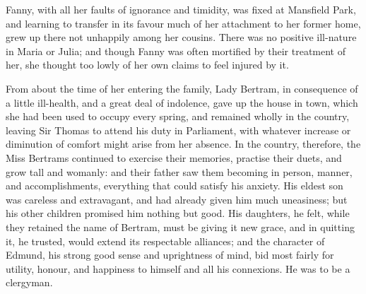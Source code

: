 \documentclass{article}
\begin{document}
Fanny, with all her faults of ignorance and timidity,
was fixed at Mansfield Park, and learning to transfer
in its favour much of her attachment to her former home,
grew up there not unhappily among her cousins.  There was
no positive ill-nature in Maria or Julia; and though
Fanny was often mortified by their treatment of her,
she thought too lowly of her own claims to feel injured
by it.

From about the time of her entering the family,
Lady Bertram, in consequence of a little ill-health,
and a great deal of indolence, gave up the house in town,
which she had been used to occupy every spring,
and remained wholly in the country, leaving Sir Thomas
to attend his duty in Parliament, with whatever increase
or diminution of comfort might arise from her absence.
In the country, therefore, the Miss Bertrams continued
to exercise their memories, practise their duets, and grow
tall and womanly:  and their father saw them becoming
in person, manner, and accomplishments, everything that
could satisfy his anxiety.  His eldest son was careless
and extravagant, and had already given him much uneasiness;
but his other children promised him nothing but good.
His daughters, he felt, while they retained the name
of Bertram, must be giving it new grace, and in quitting it,
he trusted, would extend its respectable alliances;
and the character of Edmund, his strong good sense
and uprightness of mind, bid most fairly for utility,
honour, and happiness to himself and all his connexions.
He was to be a clergyman.
\end{document}
